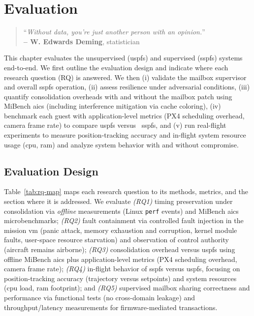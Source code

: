 %
\chapter{Evaluation}
\label{cha:evaluation}
%
\begin{quote}
\begin{flushright}
``\emph{Without data, you're just another person with an opinion.}'' \\
\textbf{-- W. Edwards Deming}, statistician
\end{flushright}
\end{quote}

This chapter evaluates the unsupervised (\gls{uspfs}) and supervised
(\gls{sspfs}) systems end-to-end. We first outline the evaluation design and
indicate where each research question (RQ) is answered. We then (i) validate the
mailbox supervisor and overall \gls{sspfs} operation, (ii) assess resilience
under adversarial conditions, (iii) quantify consolidation overheads with and
without the mailbox patch using MiBench \gls{aics} (including interference
mitigation via cache coloring), (iv) benchmark each guest with application-level
metrics (PX4 scheduling overhead, camera frame rate) to compare \gls{uspfs}
versus \
\gls{sspfs}, and (v) run real-flight experiments to measure position-tracking
accuracy and in-flight system resource usage (\gls{cpu}, \gls{ram}) and analyze
system behavior with and without compromise.

\section{Evaluation Design}
\label{sec:eval-design}
Table~\ref{tab:rq-map} maps each research question to its methods, metrics, and the section where it is addressed.
%
We evaluate \emph{(RQ1)} timing preservation under consolidation via \emph{offline} measurements (Linux \texttt{perf} events) and MiBench \gls{aics} microbenchmarks; 
\emph{(RQ2)} fault containment via controlled fault injection in the mission
\gls{vm} (panic attack, memory exhaustion and corruption, kernel module faults, user-space resource starvation) and observation of control authority (aircraft remains airborne);
\emph{(RQ3)} consolidation overhead versus \gls{uspfs} using offline MiBench
\gls{aics} plus application-level metrics (PX4 scheduling overhead, camera frame
rate);
\emph{(RQ4)} in-flight behavior of \gls{sspfs} versus \gls{uspfs}, focusing on
position-tracking accuracy (trajectory versus setpoints) and system resources
(\gls{cpu} load, \gls{ram} footprint); and 
\emph{(RQ5)} supervised mailbox sharing correctness and performance via
functional tests (no cross-domain leakage) and throughput/latency measurements
for firmware-mediated transactions.

